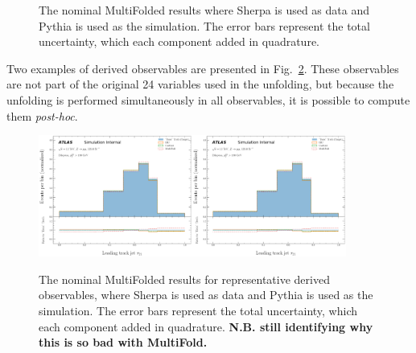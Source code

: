 \begin{figure}[h!]
\caption{The nominal MultiFolded results where Sherpa is used as data and Pythia is used as the simulation. The error bars represent the total uncertainty, which each component added in quadrature.}
\label{fig:simresultsmulti_nominal}
\end{figure}

Two examples of derived observables are presented in Fig.~\ref{fig:simresultsmulti_nominal2}.  These observables are not part of the original 24 variables used in the unfolding, but because the unfolding is performed simultaneously in all observables, it is possible to compute them \textit{post-hoc}.

\begin{figure}[h!]
\centering
\includegraphics[width=0.45\textwidth,page=1]{figures/SimResults/DerivedObservables_Results.pdf}\includegraphics[width=0.45\textwidth,page=2]{figures/SimResults/DerivedObservables_Results.pdf}
\caption{The nominal MultiFolded results for representative derived observables, where Sherpa is used as data and Pythia is used as the simulation. The error bars represent the total uncertainty, which each component added in quadrature.  \textbf{N.B. still identifying why this is so bad with MultiFold.}}
\label{fig:simresultsmulti_nominal2}
\end{figure}



